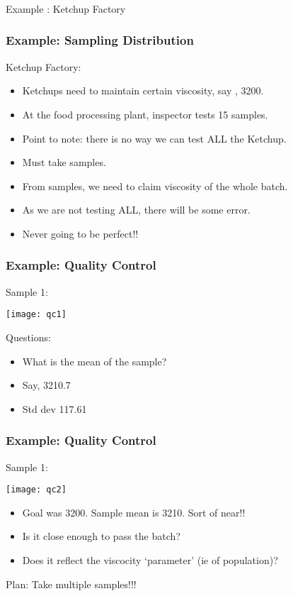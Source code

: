 \begin{frame}[fragile]\frametitle{}
\begin{center}
{\Large Example : Ketchup Factory}
\end{center}
\end{frame}

\begin{frame}[fragile]\frametitle{Example: Sampling Distribution}
Ketchup Factory:
\begin{itemize}
\item Ketchups need to maintain certain viscosity, say , 3200.
\item At the food processing plant, inspector tests 15 samples.
\item Point to note: there is no way we can test ALL the Ketchup. 
\item Must take samples.
\item From samples, we need to claim viscosity of the whole batch.
\item As we are not testing ALL, there will be some error. 
\item Never going to be perfect!!
\end{itemize}
\end{frame}

\begin{frame}[fragile]\frametitle{Example: Quality Control}
Sample 1:
\begin{center}
\texttt{[image: qc1]}
\end{center}
Questions:
\begin{itemize}
\item What is the mean of the sample? 
\item Say, 3210.7
\item Std dev 117.61
\end{itemize}
\end{frame}


\begin{frame}[fragile]\frametitle{Example: Quality Control}
Sample 1:
\begin{center}
\texttt{[image: qc2]}
\end{center}
\begin{itemize}
\item Goal was 3200. Sample mean is 3210. Sort of near!!
\item Is it close enough to pass the batch?
\item Does it reflect the viscocity `parameter' (ie of population)?
\end{itemize}
Plan: Take multiple samples!!!
\end{frame}

